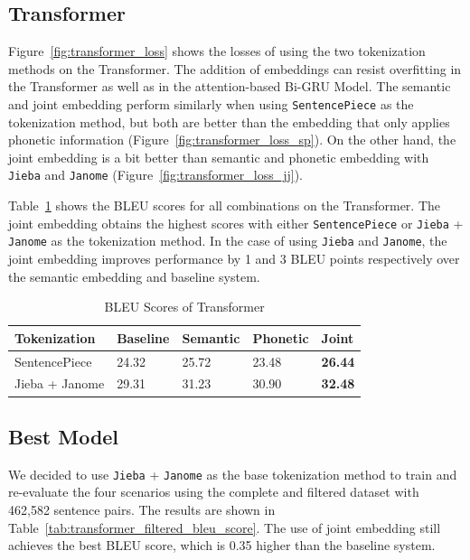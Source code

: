 \subsection{Transformer}

Figure~\ref{fig:transformer_loss} shows the losses of using the two tokenization methods on the Transformer. The addition of embeddings can resist overfitting in the Transformer as well as in the attention-based Bi-GRU Model. The semantic and joint embedding perform similarly when using \texttt{SentencePiece} as the tokenization method, but both are better than the embedding that only applies phonetic information (Figure~\ref{fig:transformer_loss_sp}). On the other hand, the joint embedding is a bit better than semantic and phonetic embedding with \texttt{Jieba} and \texttt{Janome} (Figure~\ref{fig:transformer_loss_jj}).

Table~\ref{tab:transformer_bleu_score} shows the BLEU scores for all combinations on the Transformer. The joint embedding obtains the highest scores with either \texttt{SentencePiece} or \texttt{Jieba} + \texttt{Janome} as the tokenization method. In the case of using \texttt{Jieba} and \texttt{Janome}, the joint embedding improves performance by 1 and 3 BLEU points respectively over the semantic embedding and baseline system.

\vspace{0.5cm}
\begin{table}[h]
    \centering
    \begin{tabularx}{\textwidth}{bbbbb}\toprule
        Tokenization & Baseline & Semantic & Phonetic & Joint \\\midrule
        SentencePiece & 24.32 & 25.72 & 23.48 & \textbf{26.44} \\
        Jieba + Janome & 29.31 & 31.23 & 30.90 & \textbf{32.48} \\\bottomrule
    \end{tabularx}
    \caption{BLEU Scores of Transformer}
    \label{tab:transformer_bleu_score}
\end{table}

\subsection{Best Model}

We decided to use \texttt{Jieba} + \texttt{Janome} as the base tokenization method to train and re-evaluate the four scenarios using the complete and filtered dataset with 462,582 sentence pairs. The results are shown in Table~\ref{tab:transformer_filtered_bleu_score}. The use of joint embedding still achieves the best BLEU score, which is 0.35 higher than the baseline system.

